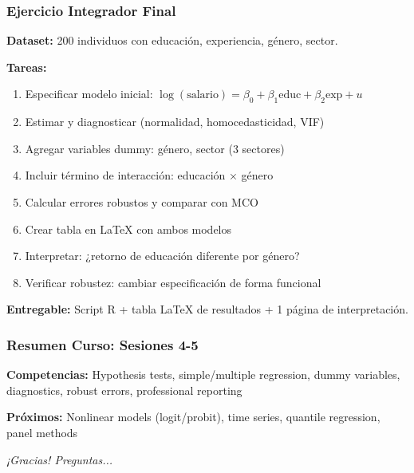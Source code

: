 \documentclass[aspectratio=169,11pt]{beamer}
\begin{document}
\begin{frame}
  \frametitle{Ejercicio Integrador Final}

  \small
  \textbf{Dataset:} 200 individuos con educación, experiencia, género, sector.

  \vspace{0.3cm}
  \textbf{Tareas:}
  \begin{enumerate}
    \item Especificar modelo inicial: $\log(\text{salario}) = \beta_0 + \beta_1 \text{educ} + \beta_2 \text{exp} + u$
    \item Estimar y diagnosticar (normalidad, homocedasticidad, VIF)
    \item Agregar variables dummy: género, sector (3 sectores)
    \item Incluir término de interacción: educación × género
    \item Calcular errores robustos y comparar con MCO
    \item Crear tabla en LaTeX con ambos modelos
    \item Interpretar: ¿retorno de educación diferente por género?
    \item Verificar robustez: cambiar especificación de forma funcional
  \end{enumerate}

  \vspace{0.3cm}
  \small \textbf{Entregable:} Script R + tabla LaTeX de resultados + 1 página de interpretación.
\end{frame}

\begin{frame}
  \frametitle{Resumen Curso: Sesiones 4-5}

  \small
  \setlength{\itemsep}{2pt}
  \textbf{Competencias:} Hypothesis tests, simple/multiple regression, dummy variables, diagnostics, robust errors, professional reporting

  \vspace{0.2cm}
  \textbf{Próximos:} Nonlinear models (logit/probit), time series, quantile regression, panel methods

  \vspace{0.3cm}
  \small \textit{¡Gracias! Preguntas...}
\end{frame}
\end{document}
